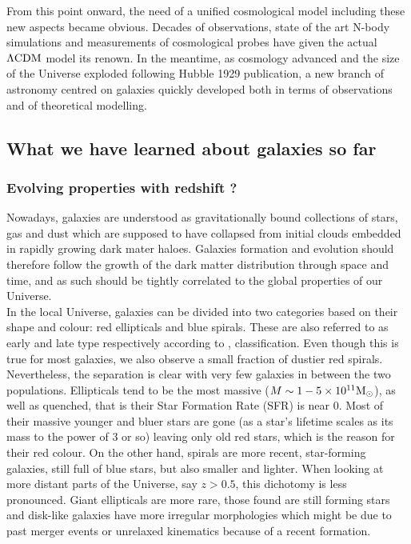 From this point onward, the need of a unified cosmological model including these new aspects became obvious. Decades of observations, state of the art N-body simulations and measurements of cosmological probes have given the actual $\Lambda \rm{CDM}$ model its renown. In the meantime, as cosmology advanced and the size of the Universe exploded following Hubble 1929 publication, a new branch of astronomy centred on galaxies quickly developed both in terms of observations and of theoretical modelling.

\subsection{What we have learned about galaxies so far}

\subsubsection{Evolving properties with redshift ?}

Nowadays, galaxies are understood as gravitationally bound collections of stars, gas and dust which are supposed to have collapsed from initial clouds embedded in rapidly growing dark mater haloes. Galaxies formation and evolution should therefore follow the growth of the dark matter distribution through space and time, and as such should be tightly correlated to the global properties of our Universe. \\

In the local Universe, galaxies can be divided into two categories based on their shape and colour: red ellipticals and blue spirals. These are also referred to as early and late type respectively according to ,   classification. Even though this is true for most galaxies, we also observe a small fraction of dustier red spirals. Nevertheless, the separation is clear with very few galaxies in between the two populations. Ellipticals tend to be the most massive ($M \sim 1-5 \times 10^{11} \rm{M_\odot}$), as well as quenched, that is their Star Formation Rate (SFR) is near $0$. Most of their massive younger and bluer stars are gone (as a star's lifetime scales as its mass to the power of 3 or so) leaving only old red stars, which is the reason for their red colour. On the other hand, spirals are more recent, star-forming galaxies, still full of blue stars, but also smaller and lighter.
When looking at more distant parts of the Universe, say $z > 0.5$, this dichotomy is less pronounced. Giant ellipticals are more rare, those found are still forming stars and disk-like galaxies have more irregular morphologies which might be due to past merger events or unrelaxed kinematics because of a recent formation.\\

